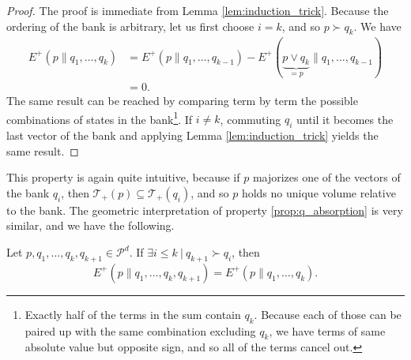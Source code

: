 \begin{proof}
    The proof is immediate from Lemma \ref{lem:induction_trick}. Because the ordering of the bank is arbitrary, let us first choose $i = k$, and so $p \succ q_k$. We have
    \begin{align}
        E^+(p \parallel q_1, \dots, q_k) &= E^+(p \parallel q_1, \dots, q_{k-1}) - E^+(\underbrace{p \vee q_k}_{= p} \parallel q_1, \dots, q_{k-1})\\
                                         &= 0.
    \end{align}
    The same result can be reached by comparing term by term the possible combinations of states in the bank\footnote{Exactly half of the terms in the sum contain $q_k$. Because each of those can be paired up with the same combination excluding $q_k$, we have terms of same absolute value but opposite sign, and so all of the terms cancel out.}. If $i \neq k$, commuting $q_i$ until it becomes the last vector of the bank and applying Lemma \ref{lem:induction_trick} yields the same result. \qedhere
\end{proof}

This property is again quite intuitive, because if $p$ majorizes one of the vectors of the bank $q_i$, then $\mathcal{T}_+(p) \subseteq \mathcal{T}_+(q_i)$, and so $p$ holds no unique volume relative to the bank. The geometric interpretation of property \ref{prop:q_absorption} is very similar, and we have the following.

\begin{appendix_lemma}
    Let $p, q_1, \dots, q_k, q_{k+1} \in \mathcal{P}^d$. If $\exists i \leq k \: | \: q_{k+1} \succ q_i$, then
    \begin{equation}
        E^+(p \parallel q_1, \dots, q_k, q_{k+1}) = E^+(p \parallel q_1, \dots, q_k).
    \end{equation}
\end{appendix_lemma}

